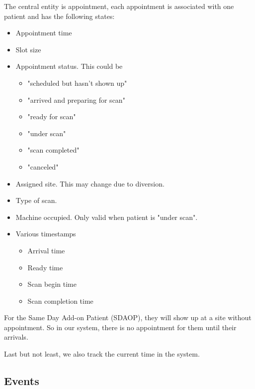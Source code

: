 The central entity is appointment, each appointment is associated
with one patient and has the following states:
\begin{itemize}
\item Appointment time
\item Slot size
\item Appointment status. This could be
  \begin{itemize}
  \item "scheduled but hasn't shown up"
  \item "arrived and preparing for scan"
  \item "ready for scan"
  \item "under scan"
  \item "scan completed"
  \item "canceled"
  \end{itemize}
\item Assigned site. This may change due to diversion.
\item Type of scan.
\item Machine occupied. Only valid when patient is "under scan".
\item Various timestamps
  \begin{itemize}
  \item Arrival time
  \item Ready time
  \item Scan begin time
  \item Scan completion time
  \end{itemize}
\end{itemize}
For the Same Day Add-on Patient (SDAOP), they will show up at
a site without appointment. So in our system, there is no
appointment for them until their arrivals.

Last but not least, we also track the current time in the system.


\subsection{Events}

